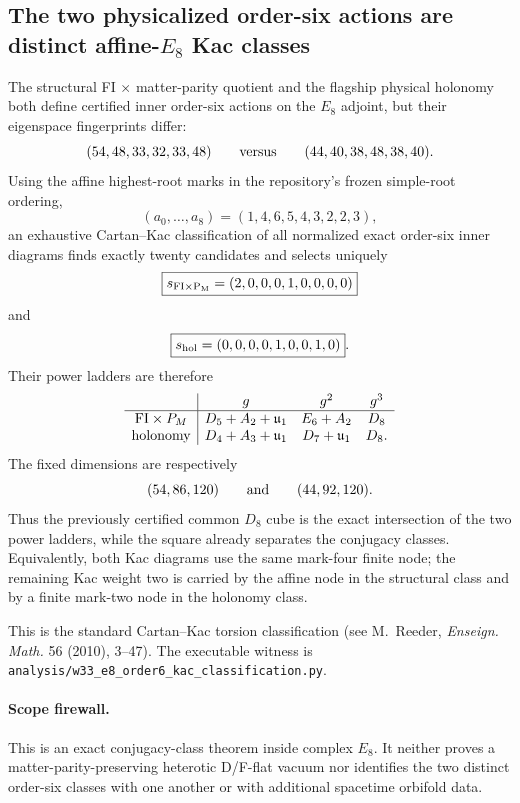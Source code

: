 \subsection*{The two physicalized order-six actions are distinct affine-$E_8$ Kac classes}

The structural FI $\times$ matter-parity quotient and the flagship physical
holonomy both define certified inner order-six actions on the $E_8$ adjoint,
but their eigenspace fingerprints differ:
\[
(54,48,33,32,33,48)
\qquad\hbox{versus}\qquad
(44,40,38,48,38,40).
\]
Using the affine highest-root marks in the repository's frozen simple-root
ordering,
\[
(a_0,\ldots,a_8)=(1,4,6,5,4,3,2,2,3),
\]
an exhaustive Cartan--Kac classification of all normalized exact order-six
inner diagrams finds exactly twenty candidates and selects uniquely
\[
\boxed{s_{\rm FI\times P_M}=(2,0,0,0,1,0,0,0,0)}
\]
and
\[
\boxed{s_{\rm hol}=(0,0,0,0,1,0,0,1,0)}.
\]
Their power ladders are therefore
\[
\begin{array}{c|ccc}
 &g&g^2&g^3\\ \hline
{\rm FI}\times P_M&
D_5+A_2+\mathfrak u_1&E_6+A_2&D_8\\
{\rm holonomy}&
D_4+A_3+\mathfrak u_1&D_7+\mathfrak u_1&D_8 .
\end{array}
\]
The fixed dimensions are respectively
\[
(54,86,120)
\qquad\hbox{and}\qquad
(44,92,120).
\]
Thus the previously certified common $D_8$ cube is the exact intersection of
the two power ladders, while the square already separates the conjugacy
classes.  Equivalently, both Kac diagrams use the same mark-four finite node;
the remaining Kac weight two is carried by the affine node in the structural
class and by a finite mark-two node in the holonomy class.

This is the standard Cartan--Kac torsion classification (see M.~Reeder,
\emph{Enseign. Math.} 56 (2010), 3--47).  The executable witness is
\texttt{analysis/w33\_e8\_order6\_kac\_classification.py}.

\paragraph{Scope firewall.}
This is an exact conjugacy-class theorem inside complex $E_8$.  It neither
proves a matter-parity-preserving heterotic D/F-flat vacuum nor identifies the
two distinct order-six classes with one another or with additional spacetime
orbifold data.
